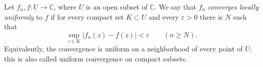 
Let $f_n,f:U\to\mathbb C$, where $U$ is an open subset of $\mathbb C$. We say that $f_n$ \emph{converges locally uniformly} to $f$ if for every compact set $K\subset U$ and every $\varepsilon>0$ there is $N$ such that
\[
\sup_{z\in K}|f_n(z)-f(z)|<\varepsilon\qquad(n\ge N).
\]
Equivalently, the convergence is uniform on a neighborhood of every point of $U$; this is also called uniform convergence on compact subsets.
